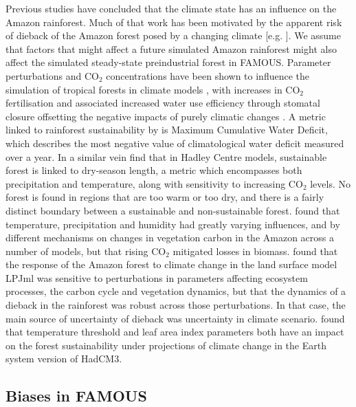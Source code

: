 \documentclass[gmd, manuscript]{copernicus}
\begin{document}
Previous studies have concluded that the climate state has an influence on the Amazon rainforest. Much of that work has been motivated by the apparent risk of dieback of the Amazon forest posed by a changing climate [e.g. \cite{malhi2008climate, cox2004amazonian}].  We assume that factors that might affect a future simulated Amazon rainforest might also affect the simulated steady-state preindustrial forest in FAMOUS. Parameter perturbations and CO$_{2}$ concentrations have been shown to influence the simulation of tropical forests in climate models \citep{boulton2017exploring, huntingford2008towards}, with increases in CO$_{2}$ fertilisation and associated increased water use efficiency through stomatal closure offsetting the negative impacts of purely climatic changes \citep{betts2007projected, Good2011}. A metric linked to rainforest sustainability by \cite{malhi2009exploring} is Maximum Cumulative Water Deficit, which describes the most negative value of climatological water deficit measured over a year. In a similar vein \cite{Good2011, Good2013} find that in Hadley Centre models, sustainable forest is linked to dry-season length, a metric which encompasses both precipitation and temperature, along with sensitivity to increasing CO$_{2}$ levels. No forest is found in regions that are too warm or too dry, and there is a fairly distinct boundary between a sustainable and non-sustainable forest. \cite{Galbraith2010} found that temperature, precipitation and humidity had greatly varying influences, and by different mechanisms on changes in vegetation carbon in the Amazon across a number of models, but that rising CO$_{2}$ mitigated losses in biomass. \cite{POULTER2010} found that the response of the Amazon forest to climate change in the land surface model LPJml was sensitive to perturbations in parameters affecting ecosystem processes, the carbon cycle and vegetation dynamics, but that the dynamics of a dieback in the rainforest was robust across those perturbations. In that case, the main source of uncertainty of dieback was uncertainty in climate scenario. \cite{boulton2017exploring} found that temperature threshold and leaf area index parameters both have an impact on the forest sustainability under projections of climate change in the Earth system version of HadCM3.


\subsection{Biases in FAMOUS}\label{ssec:biases}
\end{document}
